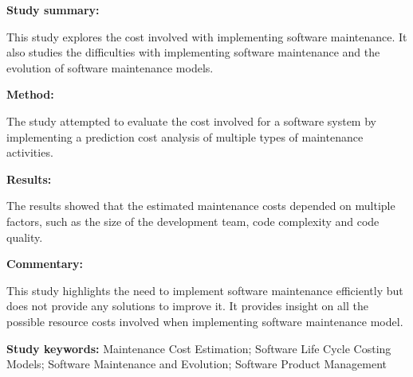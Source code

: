 \begin{tcolorbox}[colback=gray!5!white, colframe=pastelgreen!40!black, title=A cost model for software maintenance \& evolution\cite{Sneed2004}]
	\begin{minipage}[t]{0.25\textwidth}
		\textbf{Study summary:}
	\end{minipage}
	\hfill
	\begin{minipage}[t]{0.65\textwidth}
		This study explores the cost involved with implementing software maintenance. It also
		studies the difficulties with implementing software maintenance and the evolution of
		software maintenance models. 
	\end{minipage}

	\vspace{0.75em} 

	\begin{minipage}[t]{0.25\textwidth}
		\textbf{Method:}
	\end{minipage}
	\hfill
	\begin{minipage}[t]{0.65\textwidth}
		The study attempted to evaluate the cost involved for a software system by implementing a prediction cost analysis of multiple types of maintenance activities.
	\end{minipage}

	\vspace{0.75em} 

	\begin{minipage}[t]{0.25\textwidth}
		\textbf{Results:}
	\end{minipage}
	\hfill
	\begin{minipage}[t]{0.65\textwidth}
		The results showed that the estimated maintenance costs depended on multiple factors, such as the size of the development team, code complexity and code quality.
	\end{minipage}

	\vspace{0.75em} 

	\begin{minipage}[t]{0.25\textwidth}
		\textbf{Commentary:}
	\end{minipage}
	\hfill
	\begin{minipage}[t]{0.65\textwidth}
		This study highlights the need to implement software maintenance efficiently but does not provide any solutions to improve it. It provides insight on all the possible resource costs involved when implementing software maintenance model.
	\end{minipage}
	\tcblower
	\textbf{Study keywords:} Maintenance Cost Estimation; Software Life Cycle Costing Models;
	Software Maintenance and Evolution; Software Product Management
\end{tcolorbox}


